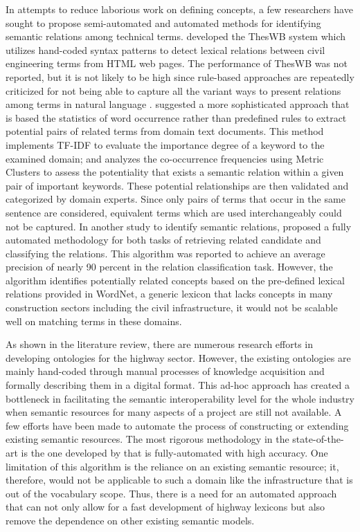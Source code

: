 \documentclass[Journal, BackFigs, DoubleSpace]{ascelike}%
\begin{document}
In attempts to reduce laborious work on defining concepts, a few researchers have sought to propose semi-automated and automated methods for identifying semantic relations among technical terms.  developed the ThesWB system which utilizes hand-coded syntax patterns to detect lexical relations between civil engineering terms from HTML web pages. The performance of ThesWB was not reported, but it is not likely to be high since rule-based approaches are repeatedly criticized for not being able to capture all the variant ways to present relations among terms in natural language \cite{Marcus95,navigli10}.  suggested a more sophisticated approach that is based the statistics of word occurrence rather than predefined rules to extract potential pairs of related terms from domain text documents. This method implements TF-IDF to evaluate the importance degree of a keyword to the examined domain; and analyzes the co-occurrence frequencies using Metric Clusters to assess the potentiality that exists a semantic relation within a given pair of important keywords. These potential relationships are then validated and categorized by domain experts. Since only pairs of terms that occur in the same sentence are considered, equivalent terms which are used interchangeably could not be captured. In another study to identify semantic relations,  proposed a fully automated methodology for both tasks of retrieving related candidate and classifying the relations. This algorithm was reported to achieve an average precision of nearly 90 percent in the relation classification task. However, the algorithm identifies potentially related concepts based on the pre-defined lexical relations provided in WordNet, a generic lexicon that lacks concepts in many construction sectors including the civil infrastructure, it would not be scalable well on matching terms in these domains.
\par
As shown in the literature review, there are numerous research efforts in developing ontologies for the highway sector. However, the existing ontologies are mainly hand-coded through manual processes of knowledge acquisition and formally describing them in a digital format. This ad-hoc approach has created a bottleneck in facilitating the semantic interoperability level for the whole industry when semantic resources for many aspects of a project are still not available. A few efforts have been made to automate the process of constructing or extending existing semantic resources. The most rigorous methodology in the state-of-the-art is the one developed by  that is fully-automated with high accuracy. One limitation of this algorithm is the reliance on an existing semantic resource; it, therefore, would not be applicable to such a domain like the infrastructure that is out of the vocabulary scope. Thus, there is a need for an automated approach that can not only allow for a fast development of highway lexicons but also remove the dependence on other existing semantic models. 
\end{document}
